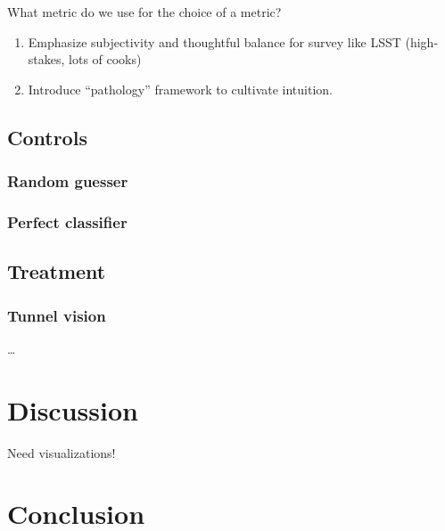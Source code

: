 \documentclass[iop]{emulateapj}
\begin{document}
What metric do we use for the choice of a metric?  

\begin{enumerate}
	\item Emphasize subjectivity and thoughtful balance for survey like 
LSST (high-stakes, lots of cooks)
	\item Introduce ``pathology'' framework to cultivate intuition.
\end{enumerate}

\subsection{Controls}

\subsubsection{Random guesser}

\subsubsection{Perfect classifier}

\subsection{Treatment}

\subsubsection{Tunnel vision}

\dots

\section{Discussion}
\label{sec:discussion}

Need visualizations!

\section{Conclusion}
\label{sec:conclusion}



\begin{acknowledgements}
\end{acknowledgements}



\end{document}
